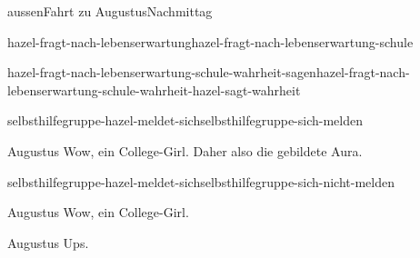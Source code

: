 \documentclass[12pt]{article}
\begin{document}
\begin{scene}{aussen}{Fahrt zu Augustus}{Nachmittag}
\begin{conditional}{hazel-fragt-nach-lebenserwartung}{hazel-fragt-nach-lebenserwartung-schule}
\begin{conditional}{hazel-fragt-nach-lebenserwartung-schule-wahrheit-sagen}{hazel-fragt-nach-lebenserwartung-schule-wahrheit-hazel-sagt-wahrheit}
                \begin{conditional}{selbsthilfegruppe-hazel-meldet-sich}{selbsthilfegruppe-sich-melden}
                    \begin{dialog}{Augustus}
                        Wow, ein College-Girl.
                        Daher also die gebildete Aura.
                    \end{dialog}
                \end{conditional}
                \begin{conditional}{selbsthilfegruppe-hazel-meldet-sich}{selbsthilfegruppe-sich-nicht-melden}
                    \begin{dialog}{Augustus}
                        Wow, ein College-Girl.
                    \end{dialog}
                \end{conditional}
            \end{conditional}
        \end{conditional}


        \begin{dialog}[beschämt]{Augustus}
            Ups.
        \end{dialog}
    \end{scene}
\end{document}
